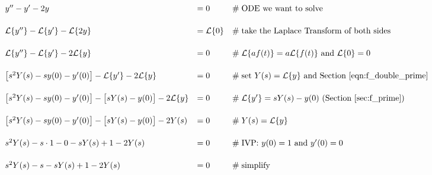 \documentclass{article}
\theoremstyle{definition}
\begin{document}
\bigskip
\begin{equation*}
\begin{array}{lllll}
y^{\prime \prime} - y^\prime -2y                                                                                     &= 0                                                 &\mathrel{\#} \text{ODE we want to solve}                                                                           \\
[15pt]
 \mathcal{L}\{y^{\prime \prime}\} - \mathcal{L}\{y^\prime\} -\mathcal{L}\{2y\}                &= \mathcal{L}\{0\}                           &\mathrel{\#} \text{take the Laplace Transform of both sides}                                              \\
[15pt]
\mathcal{L}\{y^{\prime \prime}\} - \mathcal{L}\{y^\prime\} - 2\mathcal{L}\{y\}                &= 0                                                 &\mathrel{\#} \text{$\mathcal{L}\{a f(t) \} = a \mathcal{L}\{f(t)\}$ and $\mathcal{L}\{0\} = 0$} \\
[15pt]
\big [ s^2 Y(s) - s y(0) - y^\prime (0) \big ] - \mathcal{L}\{y^\prime\} - 2\mathcal{L}\{y\} &= 0                                                 &\mathrel{\#} \text{set $Y(s) = \mathcal{L}\{y\}$ and Section \ref{eqn:f_double_prime}}      \\
[15pt]
\big [ s^2 Y(s) - s y(0) - y^\prime (0) \big ] - \big [ s Y(s) - y(0) \big ]- 2\mathcal{L}\{y\} &= 0                                                  &\mathrel{\#} \text{$ \mathcal{L}\{y^\prime\} = sY(s) - y(0)$ (Section \ref{sec:f_prime})}      \\
[15pt]
\big [ s^2 Y(s) - s y(0) - y^\prime (0) \big ] - \big [ s Y(s) - y(0) \big ]-  2 Y(s)                 &= 0                                                  &\mathrel{\#} Y(s) = \mathcal{L}\{y\}                                                                                      \\
[15pt]
s^2 Y(s) -s \cdot 1 - 0 - sY(s) + 1 - 2 Y(s)                                                                      &= 0                                                  &\mathrel{\#} \text{IVP: $y(0) = 1$ and $y^\prime (0) = 0$}                                                  \\
[15pt]
s^2 Y(s) -s  - sY(s) + 1 -2 Y(s)                                                                                      &= 0                                                    &\mathrel{\#} \text{simplify}                                                                                                  \\

\end{array}
\end{equation*}
\end{document}
